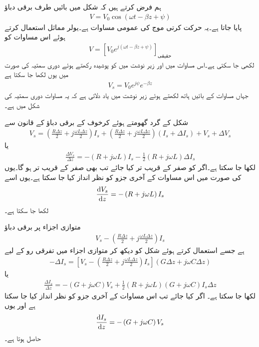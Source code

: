 ہم فرض کرتے ہیں کہ شکل  میں بائیں طرف برقی دباؤ
\begin{align*}
V=V_0 \cos (\omega t -\beta z +\psi)
\end{align*}
پایا جاتا ہے۔یہ حرکت کرتی موج کی عمومی مساوات ہے۔یولر مماثل استعمال کرتے ہوئے اس مساوات کو
\begin{align*}
V=\left[ V_0 e^{j(\omega t -\beta z +\psi)}\right]_{\text{حقیقی}}
\end{align*}
لکھی جا سکتی ہے۔اس مساوات میں  اور زیر نوشت میں  کو پوشیدہ رکھتے ہوئے دوری سمتیہ کی صورت میں یوں لکھا جا سکتا ہے
\begin{align*}
V_s =V_0 e^{j \psi} e^{-\beta z}
\end{align*}
جہاں مساوات کے بائیں ہاتھ  لکھتے ہوئے زیر نوشت میں  یاد دلاتی ہے کہ یہ مساوات دوری سمتیہ کی شکل میں ہے۔ 

شکل  کے گرد گھومتے ہوئے کرخوف کے برقی دباؤ کے قانون سے
\begin{align*}
V_s=\left(\frac{R\Delta z}{2} + j \frac{\omega L \Delta z}{2}\right) I_s+\left(\frac{R\Delta z}{2} + j \frac{\omega L \Delta z}{2}\right) \left(I_s+\Delta I_s \right)+V_s+\Delta V_s
\end{align*}
یا
\begin{align*}
\frac{\Delta V_s}{\Delta z} =-\left(R+j\omega L \right) I_s-\frac{1}{2}\left(R+j\omega L \right)\Delta I_s
\end{align*}
لکھا جا سکتا ہے۔اگر  کو صفر کے قریب تر کیا جائے تب  بھی صفر کے قریب تر ہو گا۔یوں  کی صورت میں اس مساوات کے آخری جزو کو نظر انداز کیا جا سکتا ہے۔یوں اسے
\begin{align}\label{مساوات_ترسیل_دباو_تفرقی_مساوات}
\frac{\dif V_s}{\dif z}=-\left(R+j\omega L \right) I_s
\end{align}
لکھا جا سکتا ہے۔

متوازی اجزاء پر برقی دباؤ
\begin{align*}
V_s-\left(\frac{R \Delta z}{2}+j\frac{\omega L \Delta z}{2} \right) I_s
\end{align*}
ہے جسے استعمال کرتے ہوئے شکل کو دیکھ کر متوازی اجزاء میں تفرقی رو کے لیے
\begin{align*}
-\Delta I_s = \left[V_s-\left(\frac{R \Delta z}{2}+j\frac{\omega L \Delta z}{2} \right) I_s \right] \left(G \Delta z+j \omega C \Delta z \right)
\end{align*}
یا
\begin{align*}
\frac{\Delta I_s}{\Delta z}=-\left(G+j \omega C \right) V_s +\frac{1}{2}\left(R+j \omega L \right)\left(G+j \omega C \right) I_s \Delta z
\end{align*}
لکھا جا سکتا ہے۔ اگر  کیا جائے تب اس مساوات کے آخری جزو کو نظر انداز کیا جا سکتا ہے اور یوں
\begin{align}\label{مساوات_ترسیل_رو_تفرقی_مساوات}
\frac{\dif I_s}{\dif z}=-\left(G+j \omega C \right) V_s
\end{align}
 حاصل ہوتا ہے۔

